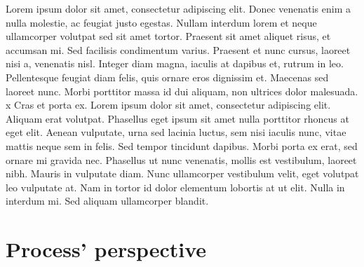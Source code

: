 \documentclass[12pt, a4paper]{book}
\begin{document}

Lorem ipsum dolor sit amet, consectetur adipiscing elit. Donec venenatis enim a nulla molestie, ac feugiat justo egestas. Nullam interdum lorem et neque ullamcorper volutpat sed sit amet tortor. Praesent sit amet aliquet risus, et accumsan mi. Sed facilisis condimentum varius. Praesent et nunc cursus, laoreet nisi a, venenatis nisl. Integer diam magna, iaculis at dapibus et, rutrum in leo. Pellentesque feugiat diam felis, quis ornare eros dignissim et. Maecenas sed laoreet nunc. Morbi porttitor massa id dui aliquam, non ultrices dolor malesuada.
x
Cras et porta ex. Lorem ipsum dolor sit amet, consectetur adipiscing elit. Aliquam erat volutpat. Phasellus eget ipsum sit amet nulla porttitor rhoncus at eget elit. Aenean vulputate, urna sed lacinia luctus, sem nisi iaculis nunc, vitae mattis neque sem in felis. Sed tempor tincidunt dapibus. Morbi porta ex erat, sed ornare mi gravida nec. Phasellus ut nunc venenatis, mollis est vestibulum, laoreet nibh. Mauris in vulputate diam. Nunc ullamcorper vestibulum velit, eget volutpat leo vulputate at. Nam in tortor id dolor elementum lobortis at ut elit. Nulla in interdum mi. Sed aliquam ullamcorper blandit.

\chapter{Process' perspective}
\end{document}
